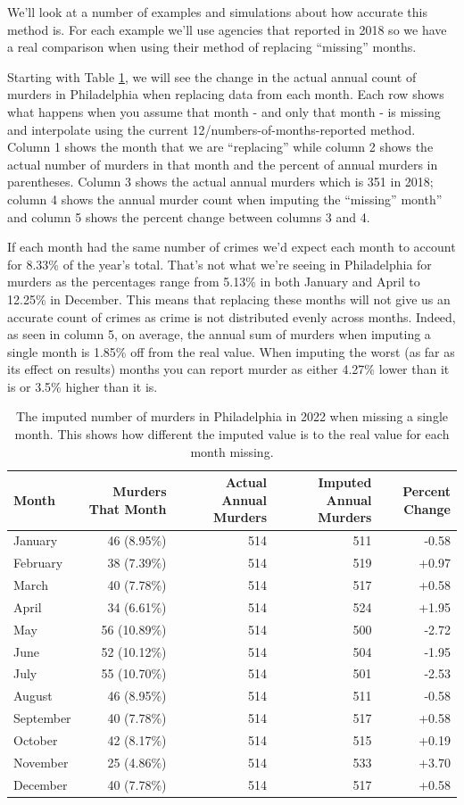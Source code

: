 \documentclass[
  12pt,
  openany]{book}
\begin{document}
We'll look at a number of examples and simulations about how accurate this method is. For each example we'll use agencies that reported in 2018 so we have a real comparison when using their method of replacing ``missing'' months.

Starting with Table \ref{tab:CountyPhillyMurders}, we will see the change in the actual annual count of murders in Philadelphia when replacing data from each month. Each row shows what happens when you assume that month - and only that month - is missing and interpolate using the current 12/numbers-of-months-reported method. Column 1 shows the month that we are ``replacing'' while column 2 shows the actual number of murders in that month and the percent of annual murders in parentheses. Column 3 shows the actual annual murders which is 351 in 2018; column 4 shows the annual murder count when imputing the ``missing'' month'' and column 5 shows the percent change between columns 3 and 4.

If each month had the same number of crimes we'd expect each month to account for 8.33\% of the year's total. That's not what we're seeing in Philadelphia for murders as the percentages range from 5.13\% in both January and April to 12.25\% in December. This means that replacing these months will not give us an accurate count of crimes as crime is not distributed evenly across months. Indeed, as seen in column 5, on average, the annual sum of murders when imputing a single month is 1.85\% off from the real value. When imputing the worst (as far as its effect on results) months you can report murder as either 4.27\% lower than it is or 3.5\% higher than it is.

\begin{longtable}[t]{lrrrr}
\caption{\label{tab:CountyPhillyMurders}The imputed number of murders in Philadelphia in 2022 when missing a single month. This shows how different the imputed value is to the real value for each month missing.}\\
\toprule
Month & Murders That Month & Actual Annual Murders & Imputed Annual Murders & Percent Change\\
\midrule
January & 46 (8.95\%) & 514 & 511 & -0.58\\
February & 38 (7.39\%) & 514 & 519 & +0.97\\
March & 40 (7.78\%) & 514 & 517 & +0.58\\
April & 34 (6.61\%) & 514 & 524 & +1.95\\
May & 56 (10.89\%) & 514 & 500 & -2.72\\
\addlinespace
June & 52 (10.12\%) & 514 & 504 & -1.95\\
July & 55 (10.70\%) & 514 & 501 & -2.53\\
August & 46 (8.95\%) & 514 & 511 & -0.58\\
September & 40 (7.78\%) & 514 & 517 & +0.58\\
October & 42 (8.17\%) & 514 & 515 & +0.19\\
\addlinespace
November & 25 (4.86\%) & 514 & 533 & +3.70\\
December & 40 (7.78\%) & 514 & 517 & +0.58\\
\bottomrule
\end{longtable}
\end{document}
